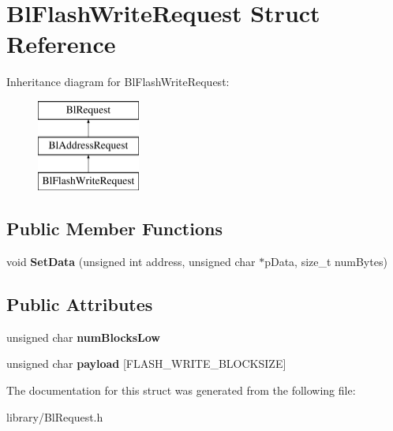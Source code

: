 \hypertarget{struct_bl_flash_write_request}{\section{Bl\-Flash\-Write\-Request Struct Reference}
\label{struct_bl_flash_write_request}
}
Inheritance diagram for Bl\-Flash\-Write\-Request\-:\begin{figure}[H]
\begin{center}
\leavevmode
\includegraphics[height=3.000000cm]{struct_bl_flash_write_request}
\end{center}
\end{figure}
\subsection*{Public Member Functions}
\begin{DoxyCompactItemize}
\item 
\hypertarget{struct_bl_flash_write_request_acf26fc08c3d7fe8d36cc195faee09ac8}{void {\bfseries Set\-Data} (unsigned int address, unsigned char $\ast$p\-Data, size\-\_\-t num\-Bytes)}\label{struct_bl_flash_write_request_acf26fc08c3d7fe8d36cc195faee09ac8}

\end{DoxyCompactItemize}
\subsection*{Public Attributes}
\begin{DoxyCompactItemize}
\item 
\hypertarget{struct_bl_flash_write_request_abff06b9442ac201c7bfb163705c90cf5}{unsigned char {\bfseries num\-Blocks\-Low}}\label{struct_bl_flash_write_request_abff06b9442ac201c7bfb163705c90cf5}

\item 
\hypertarget{struct_bl_flash_write_request_af4981efac8d54dcf31f7666f22df17f5}{unsigned char {\bfseries payload} \mbox{[}F\-L\-A\-S\-H\-\_\-\-W\-R\-I\-T\-E\-\_\-\-B\-L\-O\-C\-K\-S\-I\-Z\-E\mbox{]}}\label{struct_bl_flash_write_request_af4981efac8d54dcf31f7666f22df17f5}

\end{DoxyCompactItemize}


The documentation for this struct was generated from the following file\-:\begin{DoxyCompactItemize}
\item 
library/Bl\-Request.\-h\end{DoxyCompactItemize}
